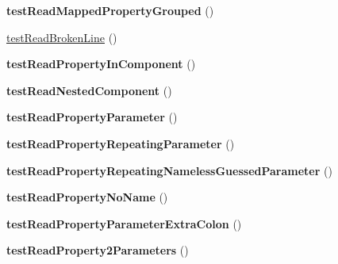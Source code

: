 \begin{DoxyCompactItemize}
{\bfseries test\+Read\+Mapped\+Property\+Grouped} ()
\item 
\mbox{\hyperlink{class_sabre_1_1_v_object_1_1_reader_test_a093db04c1adc884821b191d5fdb5bf46}{test\+Read\+Broken\+Line}} ()
\item 
\mbox{\label{class_sabre_1_1_v_object_1_1_reader_test_a63e69eedd382d9c1dbc40cbf42b19e11}} 
{\bfseries test\+Read\+Property\+In\+Component} ()
\item 
\mbox{\label{class_sabre_1_1_v_object_1_1_reader_test_a8702282efa85faf3b9c44d70d4698dd4}} 
{\bfseries test\+Read\+Nested\+Component} ()
\item 
\mbox{\label{class_sabre_1_1_v_object_1_1_reader_test_a5ec0d16174a45ef8813f887e2490e004}} 
{\bfseries test\+Read\+Property\+Parameter} ()
\item 
\mbox{\label{class_sabre_1_1_v_object_1_1_reader_test_adfdd18fb74f1e7297cb2f0aee19df641}} 
{\bfseries test\+Read\+Property\+Repeating\+Parameter} ()
\item 
\mbox{\label{class_sabre_1_1_v_object_1_1_reader_test_a6095585848809d5c3ce8329611e3e552}} 
{\bfseries test\+Read\+Property\+Repeating\+Nameless\+Guessed\+Parameter} ()
\item 
\mbox{\label{class_sabre_1_1_v_object_1_1_reader_test_ab178d65cfb728cc1763ac866f7451854}} 
{\bfseries test\+Read\+Property\+No\+Name} ()
\item 
\mbox{\label{class_sabre_1_1_v_object_1_1_reader_test_a0e87748329b6bca53b539d7fc968bc10}} 
{\bfseries test\+Read\+Property\+Parameter\+Extra\+Colon} ()
\item 
\mbox{\label{class_sabre_1_1_v_object_1_1_reader_test_a8ca807699c0d026681dd7f2df320c0a2}} 
{\bfseries test\+Read\+Property2\+Parameters} ()
\item 
\mbox{\label{class_sabre_1_1_v_object_1_1_reader_test_a3e10a6701c4d5fff9207584062196b21}} 

\end{DoxyCompactItemize}
